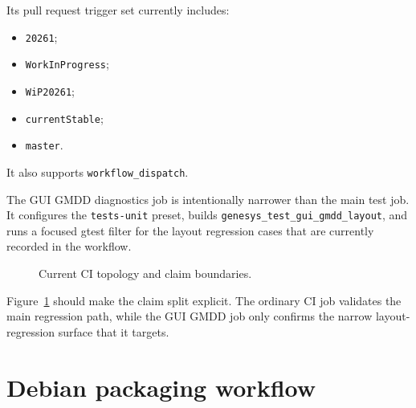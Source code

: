 Its pull request trigger set currently includes:
\begin{itemize}
\item \texttt{20261};
\item \texttt{WorkInProgress};
\item \texttt{WiP20261};
\item \texttt{currentStable};
\item \texttt{master}.
\end{itemize}
It also supports \texttt{workflow\_dispatch}.

The GUI GMDD diagnostics job is intentionally narrower than the main test job.
It configures the \texttt{tests-unit} preset, builds
\texttt{genesys\_test\_gui\_gmdd\_layout}, and runs a focused gtest filter for
the layout regression cases that are currently recorded in the workflow.

\begin{figure}[htbp]
\centering
\caption{Current CI topology and claim boundaries.}
\label{fig:packaging-ci-topology}
\end{figure}

Figure~\ref{fig:packaging-ci-topology} should make the claim split explicit.
The ordinary CI job validates the main regression path, while the GUI GMDD job
only confirms the narrow layout-regression surface that it targets.

\section{Debian packaging workflow}
\label{sec:packaging-debian-workflow}


